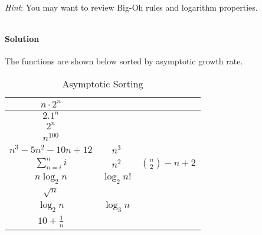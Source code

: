 \documentclass[11pt]{article}
\begin{document}
\begin{enumerate}
\emph{Hint}: You may want to review Big-Oh rules and logarithm properties.



\[
\]



\color{teal}
\paragraph{Solution} The functions are shown below sorted by asymptotic growth rate.

\begin{table}[htpb]
\color{teal}
    \centering
    \caption{Asymptotic Sorting}
    \begin{tabular}{c|c|c}
    $n\cdot2^{n}$ &  &  \\ \hline
    $2.1^{n}$  &  &  \\ \hline
    $2^{n}$ &  &  \\ \hline
    $n^{100}$ &  &  \\ \hline
    $n^3 - 5n^2 - 10n + 12$ & $n^3$ &  \\ \hline
    $\sum_{n=i}^{n} i$ & $n^2$ & ${n \choose 2}-n +2$ \\ \hline
    $n\log_2{n}$ & $\log_2{n!}$ &  \\ \hline
     $\sqrt{n} $ &  &  \\ \hline
     $\log_2{n}$ & $\log_3{n}$ &  \\ \hline
    $10 + \frac{1}{n}$ &  &  \\ \hline
    \end{tabular}
\end{table}

\end{enumerate}
\end{document}
